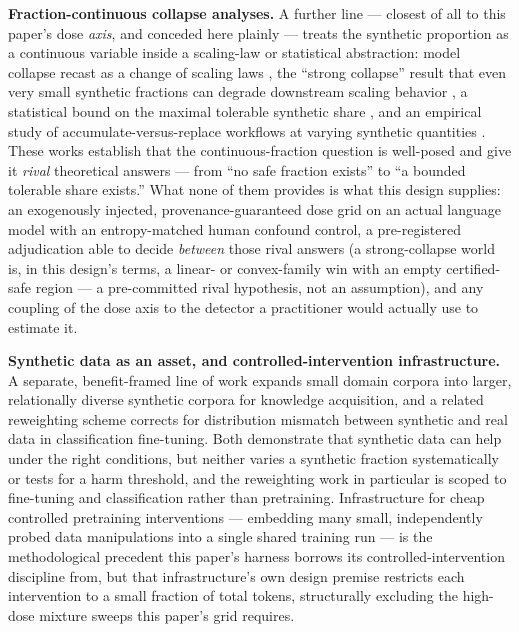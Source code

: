 \documentclass[11pt]{article}
\begin{document}
\textbf{Fraction-continuous collapse analyses.} A further line --- closest of all to this paper's dose \emph{axis}, and conceded here plainly --- treats the synthetic proportion as a continuous variable inside a scaling-law or statistical abstraction: model collapse recast as a change of scaling laws \citep{TaleOfTails}, the ``strong collapse'' result that even very small synthetic fractions can degrade downstream scaling behavior \citep{StrongModelCollapse}, a statistical bound on the maximal tolerable synthetic share \citep{SeddikSyntheticStat}, and an empirical study of accumulate-versus-replace workflows at varying synthetic quantities \citep{KazdanCollapseThrive}. These works establish that the continuous-fraction question is well-posed and give it \emph{rival} theoretical answers --- from ``no safe fraction exists'' to ``a bounded tolerable share exists.'' What none of them provides is what this design supplies: an exogenously injected, provenance-guaranteed dose grid on an actual language model with an entropy-matched human confound control, a pre-registered adjudication able to decide \emph{between} those rival answers (a strong-collapse world is, in this design's terms, a linear- or convex-family win with an empty certified-safe region --- a pre-committed rival hypothesis, not an assumption), and any coupling of the dose axis to the detector a practitioner would actually use to estimate it.

\textbf{Synthetic data as an asset, and controlled-intervention infrastructure.} A separate, benefit-framed line of work \citep{SyntheticCPT} expands small domain corpora into larger, relationally diverse synthetic corpora for knowledge acquisition, and a related reweighting scheme \citep{NotAllLLMData} corrects for distribution mismatch between synthetic and real data in classification fine-tuning. Both demonstrate that synthetic data can help under the right conditions, but neither varies a synthetic fraction systematically or tests for a harm threshold, and the reweighting work in particular is scoped to fine-tuning and classification rather than pretraining. Infrastructure for cheap controlled pretraining interventions \citep{TrainOnceAnswerAll} --- embedding many small, independently probed data manipulations into a single shared training run --- is the methodological precedent this paper's harness borrows its controlled-intervention discipline from, but that infrastructure's own design premise restricts each intervention to a small fraction of total tokens, structurally excluding the high-dose mixture sweeps this paper's grid requires.
\end{document}
